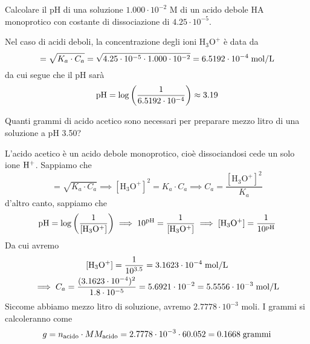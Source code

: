 \newpage

\begin{esercizio}
    Calcolare il pH di una soluzione $1.000 \cdot 10^{-2}$ M di un acido debole HA monoprotico con costante di dissociazione di $4.25 \cdot 10^{-5}$.
\end{esercizio}
\begin{soluzione}
    Nel caso di acidi deboli, la concentrazione degli ioni $\text{H}_3\text{O}^+$ è data da
    \begin{equation*}
        [\text{H}_3\text{O}^+]
        =\sqrt{K_a \cdot C_a}
        =\sqrt{4.25 \cdot 10^{-5} \cdot 1.000 \cdot 10^{-2}}
        =6.5192 \cdot 10^{-4} \; \rm mol/L
    \end{equation*}
    da cui segue che il pH sarà
    \begin{equation*}
        \rm pH=\log{\left(\frac{1}{6.5192 \cdot 10^{-4}}\right)}\approx 3.19
    \end{equation*}
\end{soluzione}

\newpage

\begin{esercizio}
    Quanti grammi di acido acetico sono necessari per preparare mezzo litro di una soluzione a pH 3.50?
\end{esercizio}
\begin{soluzione}
    L'acido acetico è un acido debole monoprotico, cioè dissociandosi cede un solo ione $\rm H^+$. Sappiamo che
    \begin{equation*}
        [\text{H}_3\text{O}^+] = \sqrt{K_a \cdot C_a}
    \implies
    [\text{H}_3\text{O}^+]^2 = K_a \cdot C_a
    \implies
    C_a=\frac{[\text{H}_3\text{O}^+]^2}{K_a}
    \end{equation*}
    d'altro canto, sappiamo che
    \begin{equation*}
        \rm pH=\log{\left(\frac{1}{[H_3O^+]}\right)}
        \implies
        10^{pH}=\frac{1}{[H_3O^+]}
        \implies
        [H_3O^+]=\frac{1}{10^{pH}}
    \end{equation*}
    Da cui avremo
    \begin{gather*}
        \rm [H_3O^+]=\frac{1}{10^{3.5}}=3.1623 \cdot 10^{-4} \; \rm mol/L
        \\
        \implies
        C_a=\frac{(3.1623 \cdot 10^{-4})^2}{1.8 \cdot 10^{-5}}=5.6921 \cdot 10^{-2}
        =5.5556 \cdot 10^{-3} \; \rm mol/L
    \end{gather*}
    Siccome abbiamo mezzo litro di soluzione, avremo $2.7778 \cdot 10^{-3}$ moli. I grammi si calcoleranno come
    \begin{equation*}
        g=n_{\text{acido}} \cdot MM_{\text{acido}}
        =2.7778 \cdot 10^{-3} \cdot 60.052
        =0.1668 \; \rm grammi
    \end{equation*}
\end{soluzione}

